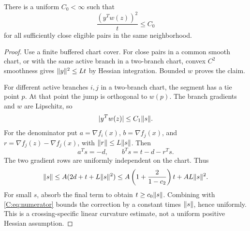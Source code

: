 \begin{lemma}\label{C:lem:secant}
There is a uniform $C_0<\infty$ such that
\[
 \frac{(y^Tw(z))^2}{t}\le C_0
\]
for all sufficiently close eligible pairs in the same neighborhood.
\end{lemma}
\begin{proof}
Use a finite buffered chart cover. For close pairs in a common smooth chart, or with the same active branch in a two-branch chart, convex $C^2$ smoothness gives $\lVert y\rVert^2\le L t$ by Hessian integration. Bounded $w$ proves the claim.

For different active branches $i,j$ in a two-branch chart, the segment has a tie point $p$. At that point the jump is orthogonal to $w(p)$. The branch gradients and $w$ are Lipschitz, so
\begin{equation}\label{C:eq:numerator}
 |y^Tw(z)|\le C_1\lVert s\rVert.
\end{equation}
For the denominator put $a=\nabla f_i(x)$, $b=\nabla f_j(x)$, and $r=\nabla f_j(z)-\nabla f_j(x)$, with $\lVert r\rVert\le L\lVert s\rVert$. Then
\[
 a^Ts=-d,\qquad b^Ts=t-d-r^Ts.
\]
The two gradient rows are uniformly independent on the chart. Thus
\[
 \lVert s\rVert\le A(2d+t+L\lVert s\rVert^2)
 \le A\left(1+\frac{2}{1-c_2}\right)t+AL\lVert s\rVert^2.
\]
For small $s$, absorb the final term to obtain $t\ge c_0\lVert s\rVert$. Combining with \eqref{C:eq:numerator} bounds the correction by a constant times $\lVert s\rVert$, hence uniformly. This is a crossing-specific linear curvature estimate, not a uniform positive Hessian assumption.
\end{proof}


\setcounter{section}{5}
\setcounter{theorem}{7}
\setcounter{equation}{15}
